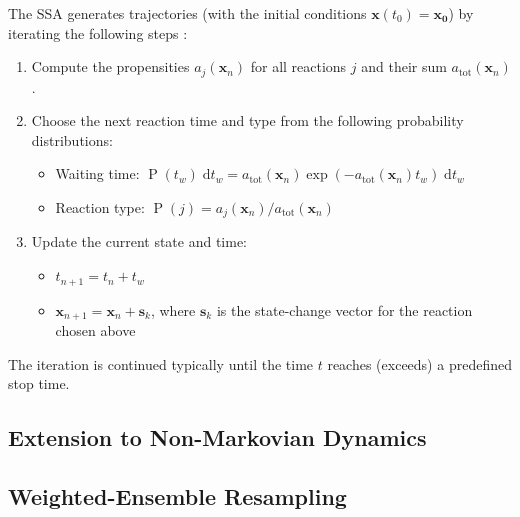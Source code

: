 \documentclass[english,letterpaper,12pt]{article}
\newcommand{\dee}{\;\mathrm{d}}
\renewcommand{\vec}[1]{\ensuremath{\mathbf{#1}}}
\DeclareMathOperator{\Prob}{P}
\begin{document}
\begin{doublespacing}
The SSA generates trajectories (with the initial conditions $\vec{x}(t_0) = \vec{x_0}$) by iterating the following steps \cite{gillespie-ssa}:
\begin{enumerate}
    \item Compute the propensities $a_j(\vec{x}_n)$ for all reactions $j$ and their sum $a_\text{tot}(\vec{x}_n)$.
    \item Choose the next reaction time and type from the following probability distributions:
    \begin{itemize}
        \item Waiting time: $\Prob(t_w)\dee t_w = a_\text{tot}(\vec{x}_n) \exp(-a_\text{tot}(\vec{x}_n) t_w) \dee t_w$
        \item Reaction type: $\Prob(j) = a_j(\vec{x}_n) / a_\text{tot}(\vec{x}_n)$
    \end{itemize}
    \item Update the current state and time:
    \begin{itemize}
        \item $t_{n+1} = t_n + t_w$
        \item $\vec{x}_{n+1} = \vec{x}_n + \vec{s}_k$, where $\vec{s}_k$ is the state-change vector for the reaction chosen above
    \end{itemize}
\end{enumerate}
The iteration is continued typically until the time $t$ reaches (exceeds) a predefined stop time.




\subsection{Extension to Non-Markovian Dynamics} %
\label{sub:non-markovian}



\subsection{Weighted-Ensemble Resampling} %
\label{sub:we-resampling-intro}


\end{doublespacing}
\end{document}
